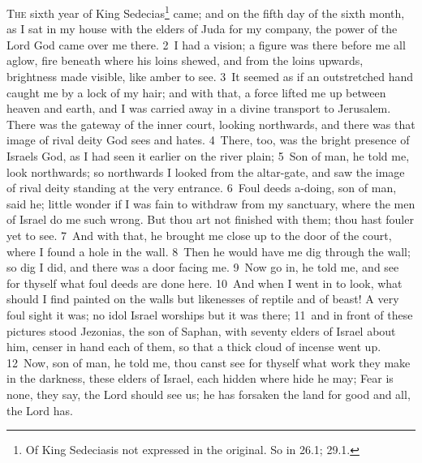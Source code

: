 \documentclass[10pt]{book} %
\begin{document}
\lettrine[lines=2]{T}{he} sixth year of King Sedecias\footnote[1]{\textasciigrave Of King Sedecias\textquotesingle  is not expressed in the original. So in 26.1; 29.1.} came; and on the fifth day of the sixth month, as I sat in my house with the elders of Juda for my company, the power of the Lord God came over me there. \textcolor{benred8}{2}~I had a vision; a figure was there before me all aglow, fire beneath where his loins shewed, and from the loins upwards, brightness made visible, like amber to see. \textcolor{benred8}{3}~It seemed as if an outstretched hand caught me by a lock of my hair; and with that, a force lifted me up between heaven and earth, and I was carried away in a divine transport to Jerusalem. There was the gateway of the inner court, looking northwards, and there was that image of rival deity God sees and hates. \textcolor{benred8}{4}~There, too, was the bright presence of Israel\textquotesingle s God, as I had seen it earlier on the river plain; \textcolor{benred8}{5}~Son of man, he told me, look northwards; so northwards I looked from the altar-gate, and saw the image of rival deity standing at the very entrance. \textcolor{benred8}{6}~Foul deeds a-doing, son of man, said he; little wonder if I was fain to withdraw from my sanctuary, where the men of Israel do me such wrong. But thou art not finished with them; thou hast fouler yet to see.
\textcolor{benred8}{7}~And with that, he brought me close up to the door of the court, where I found a hole in the wall. \textcolor{benred8}{8}~Then he would have me dig through the wall; so dig I did, and there was a door facing me. \textcolor{benred8}{9}~Now go in, he told me, and see for thyself what foul deeds are done here. \textcolor{benred8}{10}~And when I went in to look, what should I find painted on the walls but likenesses of reptile and of beast! A very foul sight it was; no idol Israel worships but it was there; \textcolor{benred8}{11}~and in front of these pictures stood Jezonias, the son of Saphan, with seventy elders of Israel about him, censer in hand each of them, so that a thick cloud of incense went up. \textcolor{benred8}{12}~Now, son of man, he told me, thou canst see for thyself what work they make in the darkness, these elders of Israel, each hidden where hide he may; Fear is none, they say, the Lord should see us; he has forsaken the land for good and all, the Lord has.
\end{document}
